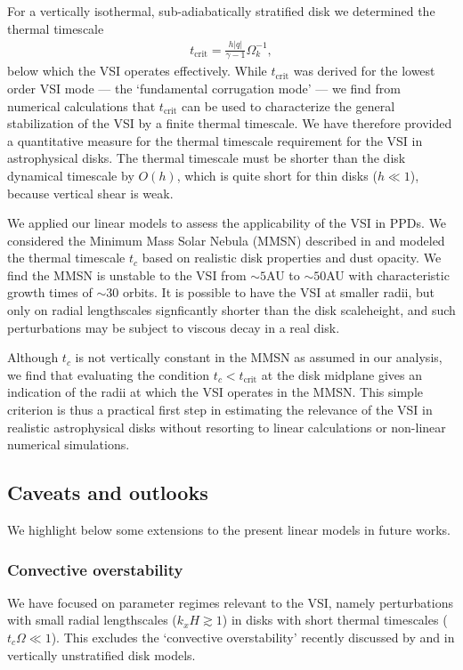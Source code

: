 For a vertically isothermal, sub-adiabatically stratified disk we
determined the thermal timescale   
\begin{align*}
  t_\mathrm{crit} = \frac{ h |q|}{\gamma-1}\Omega_k^{-1}, 
\end{align*}
below which the VSI operates effectively. While $t_\mathrm{crit}$ was
derived for the lowest order VSI mode --- the `fundamental  
corrugation mode' --- we find from numerical calculations that
$t_\mathrm{crit}$ can be used to characterize the general
stabilization of the VSI by a finite thermal timescale. %
We have therefore provided a quantitative measure for the thermal
timescale requirement for the VSI in astrophysical 
disks. The thermal timescale must be shorter than the disk
dynamical timescale by $O( h)$, which is
quite short for thin disks ($ h\ll 1$), because vertical shear is weak.    

We applied our linear models to assess the applicability of the VSI in
PPDs. We considered the Minimum Mass Solar Nebula 
(MMSN) described in \cite{chiang10} and   
modeled the thermal timescale $t_c$ based on realistic
disk properties and dust opacity. 
We find the MMSN is unstable to the VSI 
from $\sim 5$AU to $\sim50$AU with characteristic growth times of
$\sim 30$ orbits. It is possible to have the VSI at smaller
radii, but only on radial lengthscales signficantly shorter
than the disk scaleheight, and such perturbations may
be subject to viscous decay in a real disk.   

Although $t_c$ is not vertically constant in the 
MMSN as assumed in our analysis, we find that evaluating the condition
$t_c< t_\mathrm{crit}$ at the disk midplane gives an indication of the
radii at which the VSI operates in the MMSN. This simple criterion is
thus a practical first step in estimating the relevance of the VSI in
realistic astrophysical disks without resorting to linear
calculations or non-linear numerical simulations.   

\subsection{Caveats and outlooks} 
We highlight below some extensions to the present  
linear models in future works.  

\subsubsection{Convective overstability}
We have focused on parameter regimes relevant to the VSI,
namely perturbations with small radial lengthscales 
($k_xH\gtrsim 1$) in disks with short thermal timescales
($t_c\Omega\ll 1$). This excludes the `convective overstability'
recently discussed by \cite{klahr14} and \cite{lyra14} in vertically
unstratified disk models.   

